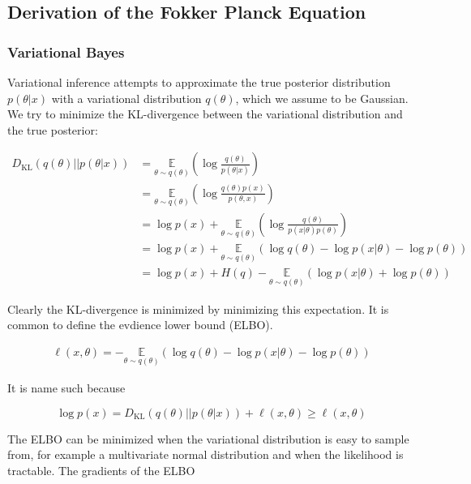 \documentclass{ucetd}
\begin{document}
\begin{appendices}
\chapter{Derivation of the Fokker Planck Equation}

\subsection{Variational Bayes}

Variational inference attempts to approximate the true posterior distribution $p(\theta|x)$ with a variational distribution $q(\theta)$, which we assume to be Gaussian. We try to minimize the KL-divergence between the variational distribution and the true posterior:

\begin{align*}
D_{\mathrm{KL}}(q(\theta)||p(\theta|x)) &= \underset{{\theta \sim q(\theta)}}{\mathbb{E}}\left(\log\frac{q(\theta)}{p(\theta|x)}\right)\\
&=  \underset{{\theta \sim q(\theta)}}{\mathbb{E}}\left(\log\frac{q(\theta)p(x)}{p(\theta,x)}\right)\\
&=  \log p(x) + \underset{{\theta \sim q(\theta)}}{\mathbb{E}}\left(\log\frac{q(\theta)}{p(x|\theta)p(\theta)}\right)\\
&= \log p(x) + \underset{{\theta \sim q(\theta)}}{\mathbb{E}}\left(\log q(\theta) - \log p(x|\theta) - \log p(\theta) \right)\\
&= \log p(x) + H(q) -\underset{{\theta \sim q(\theta)}}{\mathbb{E}}\left(\log p(x|\theta) + \log p(\theta) \right)
\end{align*}

Clearly the KL-divergence is minimized by minimizing this expectation. It is common to define the evdience lower bound (ELBO).

\begin{align*}
\ell(x,\theta) = - \underset{{\theta \sim q(\theta)}}{\mathbb{E}}\left(\log q(\theta) - \log p(x|\theta) - \log p(\theta) \right)
\end{align*}

It is name such because

\begin{equation*}
\log p(x) = D_{\mathrm{KL}}(q(\theta)||p(\theta|x)) + \ell(x,\theta) \geq \ell(x,\theta)
\end{equation*}

The ELBO can be minimized when the variational distribution is easy to sample from, for example a multivariate normal distribution and when the likelihood is tractable. The gradients of the ELBO


\end{appendices}
\end{document}
